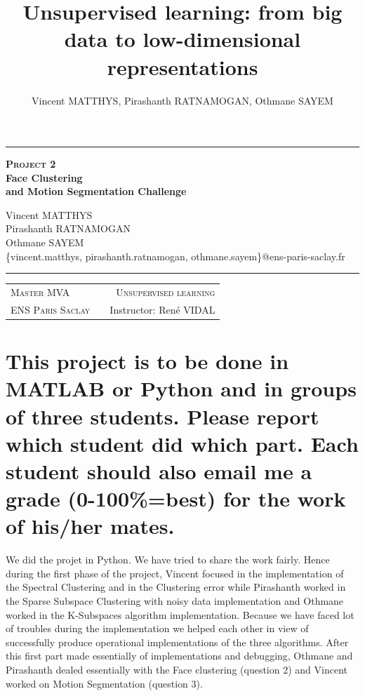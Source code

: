 \documentclass[12pt,a4paper,onecolumn]{article}
\title{Unsupervised learning: from big data to low-dimensional representations}
\author{Vincent MATTHYS, Pirashanth RATNAMOGAN, Othmane SAYEM}
\date{}
\begin{document}
\thispagestyle{empty}

\maketitle

\begin{center}
	\rule[11pt]{5cm}{0.5pt}

	\textbf{\LARGE \textsc{Project 2}\\Face Clustering\\and Motion Segmentation Challenge}
	\vspace{0.5cm}

	Vincent MATTHYS\\Pirashanth RATNAMOGAN\\Othmane SAYEM\\

	\{vincent.matthys, pirashanth.ratnamogan, othmane.sayem\}@ens-paris-saclay.fr

	\rule{5cm}{0.5pt}

	\vspace{1.5cm}
\end{center}

\begin{tabularx}{0.9\textwidth}{@{} l X r @{} }
	{\textsc{Master MVA}}     &  & \textsc{Unsupervised learning} \\
	\textsc{ENS Paris Saclay} &  & {Instructor: René VIDAL}       \\
\end{tabularx}


\clearpage
\thispagestyle{fancy}

\setcounter{section}{-1}
\section{This project is to be done in MATLAB or Python and in groups of three students.  Please report
  which student did which part. Each student should also email me a grade (0-100\%=best) for the work of his/her mates.}

We did the projet in Python. We have tried to share the work fairly. Hence during the first phase of the project, Vincent focused in the implementation of the Spectral Clustering and in the Clustering error while Pirashanth worked in the  Sparse Subspace Clustering with noisy data implementation and Othmane worked in the K-Subspaces algorithm implementation.
Because we have faced lot of troubles during the implementation we helped each other in view of successfully produce operational implementations of the three algorithms.
After this first part made essentially of implementations and debugging, Othmane and Pirashanth dealed essentially with the Face clustering (question 2) and Vincent worked on Motion Segmentation (question 3).
\end{document}
